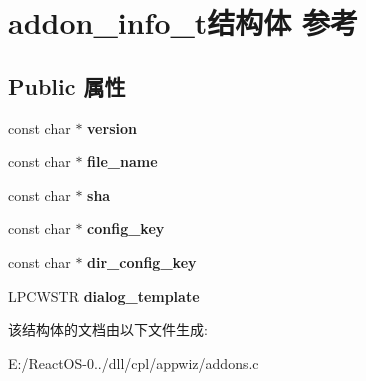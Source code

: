 \hypertarget{structaddon__info__t}{}\section{addon\+\_\+info\+\_\+t结构体 参考}
\label{structaddon__info__t}
\subsection*{Public 属性}
\begin{DoxyCompactItemize}
\item 
\mbox{\label{structaddon__info__t_adea774fcb444948bb500b3afb3c03596}} 
const char $\ast$ {\bfseries version}
\item 
\mbox{\label{structaddon__info__t_a2ab5f0c53af488dc09e85958dae2381d}} 
const char $\ast$ {\bfseries file\+\_\+name}
\item 
\mbox{\label{structaddon__info__t_a08f221bbdeea4074927fe75e18d6b6a4}} 
const char $\ast$ {\bfseries sha}
\item 
\mbox{\label{structaddon__info__t_af9b73a05b0cc48f6dd1c30b5abae59c4}} 
const char $\ast$ {\bfseries config\+\_\+key}
\item 
\mbox{\label{structaddon__info__t_aadfa7eb9c0016a41b6d866b4e4d664bc}} 
const char $\ast$ {\bfseries dir\+\_\+config\+\_\+key}
\item 
\mbox{\label{structaddon__info__t_a2a75c965ee089ea6bfe597bd879ed7e2}} 
L\+P\+C\+W\+S\+TR {\bfseries dialog\+\_\+template}
\end{DoxyCompactItemize}


该结构体的文档由以下文件生成\+:\begin{DoxyCompactItemize}
\item 
E\+:/\+React\+O\+S-\/0../dll/cpl/appwiz/addons.\+c\end{DoxyCompactItemize}
